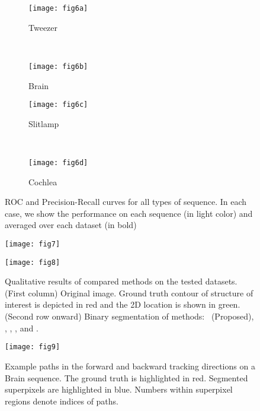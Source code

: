 \begin{figure}[t!]
    \centering
    \begin{subfigure}[b]{0.5\textwidth}
        \centering
        \texttt{[image: fig6a]}
        \caption{Tweezer}
    \end{subfigure}%
    ~ 
    \begin{subfigure}[b]{0.5\textwidth}
        \centering
        \texttt{[image: fig6b]}
        \caption{Brain}
    \end{subfigure}
    \begin{subfigure}[b]{0.5\textwidth}
        \centering
        \texttt{[image: fig6c]}
        \caption{Slitlamp}
    \end{subfigure}%
    ~ 
    \begin{subfigure}[b]{0.5\textwidth}
        \centering
        \texttt{[image: fig6d]}
        \caption{Cochlea}
    \end{subfigure}
    \caption{ROC and Precision-Recall curves for all types of sequence. In each case, we show the performance on each sequence (in light color) and averaged over each dataset (in bold)}
    \label{fig:ROC-PR}
\end{figure}


\begin{figure}
\centering
\texttt{[image: fig7]}
\caption{}
\label{fig:sp_limits}
\end{figure}

\begin{figure}
\centering
\texttt{[image: fig8]}
\caption{Qualitative results of compared methods on the tested datasets. (First column) Original image. Ground truth contour of structure of interest is depicted in red and the 2D location is shown in green. (Second row onward) Binary segmentation of methods: \KSPnb ~(Proposed), \EELnb, \PSVMnb, \GSnb, and \DLnb.}
\label{fig:all}
\end{figure}

\begin{figure}[t]
\centering
\texttt{[image: fig9]}
\caption{
Example paths in the forward and backward tracking directions on a Brain sequence. The ground truth is highlighted in red. Segmented superpixels are highlighted in blue. Numbers within superpixel regions denote indices of paths.
}
\label{fig:brain_paths}
\end{figure}

